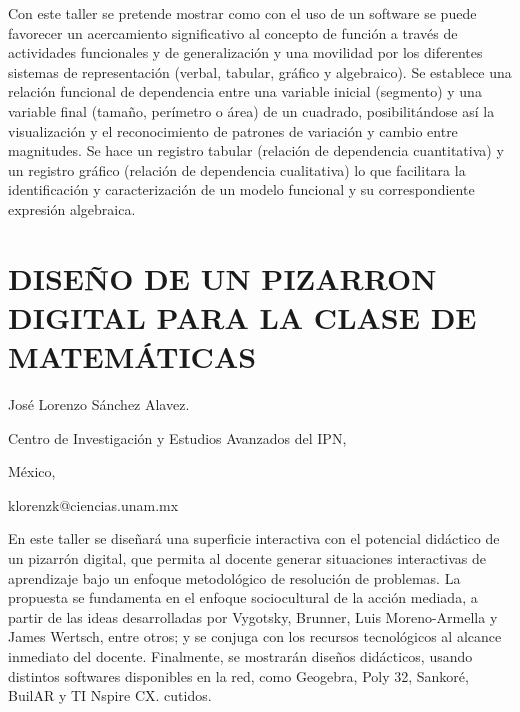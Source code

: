 Con este taller se pretende mostrar como con el uso de un software
se puede favorecer un acercamiento significativo al concepto de función
a través de actividades funcionales y de generalización y una movilidad
por los diferentes sistemas de representación (verbal, tabular, gráfico
y algebraico). Se establece una relación funcional de dependencia
entre una variable inicial (segmento) y una variable final (tamaño,
perímetro o área) de un cuadrado, posibilitándose así la visualización
y el reconocimiento de patrones de variación y cambio entre magnitudes.
Se hace un registro tabular (relación de dependencia cuantitativa)
y un registro gráfico (relación de dependencia cualitativa) lo que
facilitara la identificación y caracterización de un modelo funcional
y su correspondiente expresión algebraica. 


\section{DISEÑO DE UN PIZARRON DIGITAL PARA LA CLASE DE MATEMÁTICAS}

\begin{datos}

José Lorenzo Sánchez Alavez.

Centro de Investigación y Estudios Avanzados del IPN,

México,

klorenzk@ciencias.unam.mx

\end{datos}

En este taller se diseñará una superficie interactiva con el potencial
didáctico de un pizarrón digital, que permita al docente generar situaciones
interactivas de aprendizaje bajo un enfoque metodológico de resolución
de problemas. La propuesta se fundamenta en el enfoque sociocultural
de la acción mediada, a partir de las ideas desarrolladas por Vygotsky,
Brunner, Luis Moreno-Armella y James Wertsch, entre otros; y se conjuga
con los recursos tecnológicos al alcance inmediato del docente. Finalmente,
se mostrarán diseños didácticos, usando distintos softwares disponibles
en la red, como Geogebra, Poly 32, Sankoré, BuilAR y TI Nspire CX.
cutidos. 


